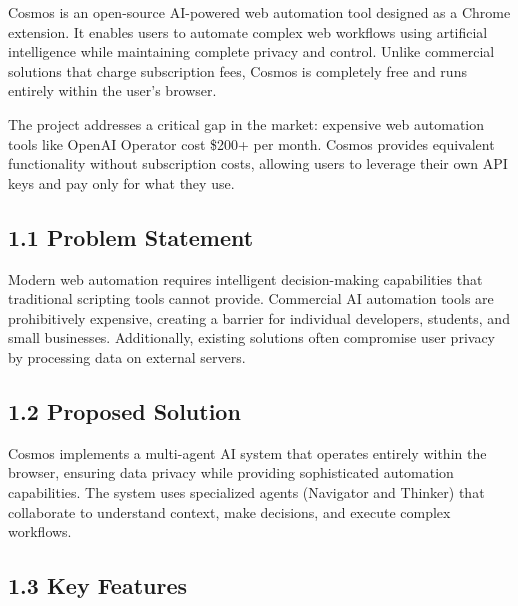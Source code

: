\documentclass[12pt,a4paper]{article}
\begin{document}
\setlength{\parindent}{0.5in}

Cosmos is an open-source AI-powered web automation tool designed as a Chrome extension. It enables users to automate complex web workflows using artificial intelligence while maintaining complete privacy and control. Unlike commercial solutions that charge subscription fees, Cosmos is completely free and runs entirely within the user's browser.

\vspace{0.3cm}

The project addresses a critical gap in the market: expensive web automation tools like OpenAI Operator cost \$200+ per month. Cosmos provides equivalent functionality without subscription costs, allowing users to leverage their own API keys and pay only for what they use.

\vspace{0.3cm}

\subsection*{\textbf{1.1 Problem Statement}}

Modern web automation requires intelligent decision-making capabilities that traditional scripting tools cannot provide. Commercial AI automation tools are prohibitively expensive, creating a barrier for individual developers, students, and small businesses. Additionally, existing solutions often compromise user privacy by processing data on external servers.

\vspace{0.3cm}

\subsection*{\textbf{1.2 Proposed Solution}}

Cosmos implements a multi-agent AI system that operates entirely within the browser, ensuring data privacy while providing sophisticated automation capabilities. The system uses specialized agents (Navigator and Thinker) that collaborate to understand context, make decisions, and execute complex workflows.

\vspace{0.3cm}

\subsection*{\textbf{1.3 Key Features}}
\end{document}
